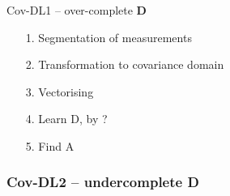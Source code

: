   
\begin{algorithm}[H]
\caption{Cov-DL1 -- over-complete $\mathbf{D}$}
\begin{itemize}
\item[1.] Segmentation of measurements 
\item[2.] Transformation to covariance domain
\item[3.] Vectorising 
\item[4.] Learn D, by ?
\item[5.] Find A
\end{itemize}
\end{algorithm}


\subsubsection*{Cov-DL2 -- undercomplete \textbf{D}}




